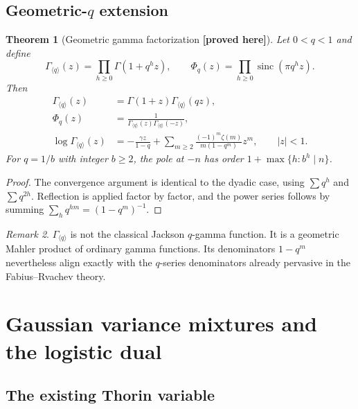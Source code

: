 \documentclass[11pt,oneside]{article}
\newtheorem{theorem}{Theorem}[section]
\theoremstyle{definition}
\theoremstyle{remark}
\newtheorem{remark}[theorem]{Remark}
\newcommand{\sinc}{\operatorname{sinc}}
\newcommand{\GammaGeom}{\Gamma_{\langle q\rangle}}
\newcommand{\New}{\textcolor{amber}{\textbf{[proved here]}}}
\begin{document}
\subsection{Geometric-\texorpdfstring{$q$}{q} extension}

\begin{theorem}[Geometric gamma factorization \New]
Let $0<q<1$ and define
\begin{equation}
 \GammaGeom(z)=\prod_{h\ge0}\Gamma(1+q^hz),
 \qquad
 \Phi_q(z)=\prod_{h\ge0}\sinc(\pi q^hz).                \label{eq:q-geometric-gamma}
\end{equation}
Then
\begin{align}
 \GammaGeom(z)&=\Gamma(1+z)\GammaGeom(qz),               \label{eq:q-gamma-Mahler}\\
 \Phi_q(z)&=\frac{1}{\GammaGeom(z)\GammaGeom(-z)},       \label{eq:q-gamma-reflection}\\
 \log\GammaGeom(z)
 &=-\frac{\gamma z}{1-q}
 +\sum_{m\ge2}\frac{(-1)^m\zeta(m)}{m(1-q^m)}z^m,
 \qquad |z|<1.                                           \label{eq:q-gamma-series}
\end{align}
For $q=1/b$ with integer $b\ge2$, the pole at $-n$ has order
$1+\max\{h:b^h\mid n\}$.
\end{theorem}

\begin{proof}
The convergence argument is identical to the dyadic case, using
$\sum q^h$ and $\sum q^{2h}$.  Reflection is applied factor by factor, and the power series
follows by summing $\sum_hq^{hm}=(1-q^m)^{-1}$.
\end{proof}

\begin{remark}
$\GammaGeom$ is not the classical Jackson $q$-gamma function.  It is a geometric Mahler
product of ordinary gamma functions.  Its denominators $1-q^m$ nevertheless align exactly
with the $q$-series denominators already pervasive in the Fabius--Rvachev theory.
\end{remark}

\section{Gaussian variance mixtures and the logistic dual}
\label{sec:gaussian-mixture}

\subsection{The existing Thorin variable}
\end{document}
